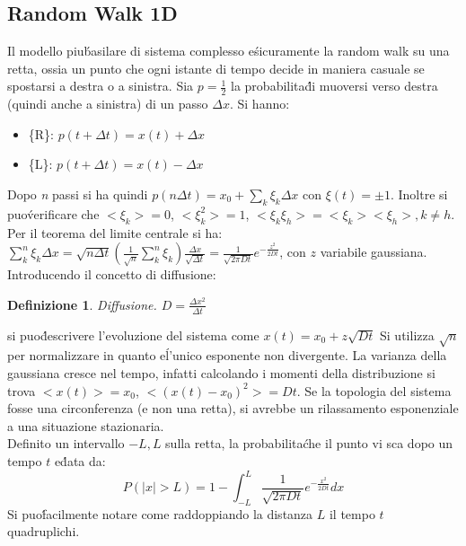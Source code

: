 \documentclass[12pt, a4paper]{book}
\theoremstyle{theorem}
\newtheorem{definition}{Definizione}[section]
\begin{document}
			\subsection{Random Walk 1D}
				Il modello piu\' basilare di sistema complesso e\' sicuramente la random walk su una retta, ossia un punto che ogni istante di tempo decide in maniera casuale se spostarsi a destra o a sinistra.
				Sia $p=\frac{1}{2}$ la probabilita\' di muoversi verso destra (quindi anche a sinistra) di un passo $\Delta x$. Si hanno:
				\begin{itemize}
					\item \{R\}: $p(t+\Delta t)=x(t)+\Delta x$
					\item \{L\}: $p(t+\Delta t)=x(t)-\Delta x$
				\end{itemize}
				Dopo \textit{n} passi si ha quindi $p(n\Delta t)=x_0+\sum_k\xi_k\Delta x$ con $\xi(t)=\pm 1$.
				Inoltre si puo\' verificare che $<\xi_k>=0$, $<\xi_k^2>=1$, $<\xi_k\xi_h>=<\xi_k><\xi_h>, k\neq h$.
				Per il teorema del limite centrale si ha:
				$\sum_k^n\xi_k\Delta x=\sqrt{n\Delta t}\left(\frac{1}{\sqrt{n}}\sum_k^n\xi_k\right)\frac{\Delta x}{\sqrt{\Delta t}}=\frac{1}{\sqrt{2\pi Dt}}e^{-\frac{z^2}{2Dt}}$, con $z$ variabile gaussiana.
				Introducendo il concetto di diffusione:\\
				\begin{definition}
					Diffusione. $D=\frac{\Delta x^2}{\Delta t}$
				\end{definition}
				si puo\' descrivere l'evoluzione del sistema come $x(t)=x_0+z\sqrt{Dt}$
				Si utilizza $\sqrt{n}$ per normalizzare in quanto e\' l'unico esponente non divergente.
				La varianza della gaussiana cresce nel tempo, infatti calcolando i momenti della distribuzione si trova $<x(t)>=x_0$, $<(x(t)-x_0)^2>=Dt$.
				Se la topologia del sistema fosse una circonferenza (e non una retta), si avrebbe un rilassamento esponenziale a una situazione stazionaria.
				\\Definito un intervallo $-L,L$ sulla retta, la probabilita\' che il punto vi sca dopo un tempo $t$ e\' data da:
				\begin{equation}
					P(\left\lvert x\right\rvert >L)=1-\int_{-L}^{L}\frac{1}{\sqrt{2\pi Dt}}e^{-\frac{x^2}{2Dt}}dx
				\end{equation}
				Si puo\' facilmente notare come raddoppiando la distanza $L$ il tempo $t$ quadruplichi.
\end{document}
